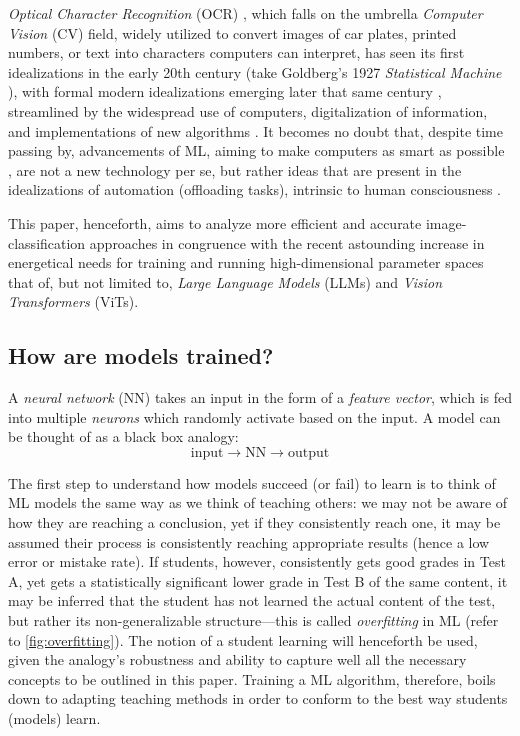 \documentclass[conference]{IEEEtran}
\begin{document}
\textit{Optical Character Recognition} (OCR) \cite{dtic1978}, which falls on the umbrella \textit{Computer Vision} (CV) field, widely utilized to convert images of car plates, printed numbers, or text into characters computers can interpret, has seen its first idealizations in the early 20th century (take Goldberg's 1927 \textit{Statistical Machine} \cite{goldberg1927}), with formal modern idealizations emerging later that same century \cite{hough1962, hough1962_patent}, streamlined by the widespread use of computers, digitalization of information, and implementations of new algorithms \cite{cnn1989, tesseract2006}. It becomes no doubt that, despite time passing by, advancements of ML, aiming to make computers as smart as possible \cite{aima2021}, are not a new technology per se, but rather ideas that are present in the idealizations of automation (offloading tasks), intrinsic to human consciousness \cite{kahneman2011}.

This paper, henceforth, aims to analyze more efficient and accurate image-classification approaches in congruence with the recent astounding increase in energetical needs for training and running high-dimensional parameter spaces that of, but not limited to, \textit{Large Language Models} (LLMs) and \textit{Vision Transformers} (ViTs).

\subsection{How are models trained?}

A \textit{neural network} (NN) takes an input in the form of a \textit{feature vector}, which is fed into multiple \textit{neurons} which randomly activate based on the input. A model can be thought of as a black box analogy:
\begin{equation}
    \text{input} \to \boxed{\text{NN} } \to \text{output}
\end{equation}

The first step to understand how models succeed (or fail) to learn is to think of ML models the same way as we think of teaching others: we may not be aware of how they are reaching a conclusion, yet if they consistently reach one, it may be assumed their process is consistently reaching appropriate results (hence a low error or mistake rate). If students, however, consistently gets good grades in Test A, yet gets a statistically significant lower grade in Test B of the same content, it may be inferred that the student has not learned the actual content of the test, but rather its non-generalizable structure---this is called \textit{overfitting} in ML \cite{overfitting2004, aima2021} (refer to \cref{fig:overfitting}). The notion of a student learning will henceforth be used, given the analogy's robustness and ability to capture well all the necessary concepts to be outlined in this paper. Training a ML algorithm, therefore, boils down to adapting teaching methods in order to conform to the best way students (models) learn.
\end{document}
